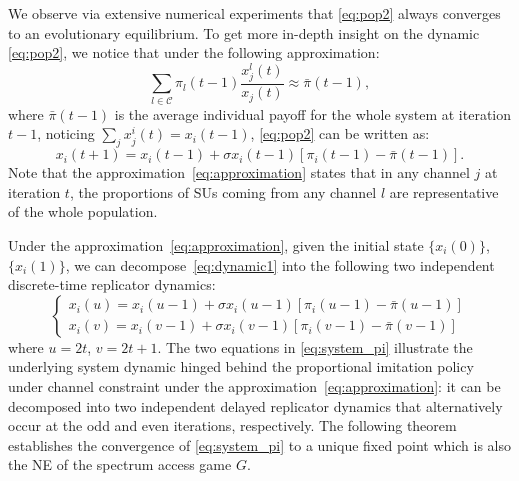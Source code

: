 \documentclass[12pt, onecolumn]{IEEEtran}
\theoremstyle{plain}
\theoremstyle{definition}
\begin{document}
\begin{comment}

\begin{figure*}
\begin{minipage}[r]{0.49\linewidth}
\texttt{[image: approximation.eps]}
\caption{System dynamic and its approximation by double replicator dynamic.}
\label{fig:approximation}
\end{minipage} \hfill
\begin{minipage}[c]{0.49\linewidth}
\texttt{[image: oursVSreplicators.eps]}
\caption{System dynamic with channel constraint and replicator dynamic without channel constraint}
\label{fig:oursVSreplicators}
\end{minipage}\hfill
\vspace{0.5cm}
\end{figure*}

\end{comment}


We observe via extensive numerical experiments that \eqref{eq:pop2} always converges to an evolutionary equilibrium. To get more in-depth insight on the dynamic \eqref{eq:pop2}, we notice that under the following approximation:
\begin{equation}
\sum_{l \in \mathcal{C}} \pi_l(t-1)\frac{x_j^l(t)}{x_j(t)} \approx \bar{\pi}(t-1),
\label{eq:approximation}
\end{equation}
where $\bar{\pi}(t-1)$ is the average individual payoff for the whole system at iteration $t-1$, noticing $\sum_j x_j^i(t)=x_i(t-1)$, \eqref{eq:pop2} can be written as:
\begin{equation}
x_i(t+1)=x_i(t-1)+\sigma x_i(t-1)[\pi_i(t-1)-\bar{\pi}(t-1)].
\label{eq:dynamic1}
\end{equation}
Note that the approximation~\eqref{eq:approximation} states that in any channel $j$ at iteration $t$, the proportions of SUs coming from any channel $l$ are representative of the whole population.

Under the approximation~\eqref{eq:approximation}, given the initial state $\{x_i(0)\}$, $\{x_i(1)\}$, we can decompose~\eqref{eq:dynamic1} into the following two independent discrete-time replicator dynamics:
\begin{equation}
\begin{cases}
x_i(u)=x_i(u-1)+\sigma x_i(u-1)[\pi_i(u-1)-\bar{\pi}(u-1)] \\
x_i(v)=x_i(v-1)+\sigma x_i(v-1)[\pi_i(v-1)-\bar{\pi}(v-1)]
\end{cases}
\label{eq:system_pi}
\end{equation}
where $u=2t$, $v=2t+1$. The two equations in \eqref{eq:system_pi} illustrate the underlying system dynamic hinged behind the proportional imitation policy under channel constraint under the approximation~\eqref{eq:approximation}: it can be decomposed into two independent delayed replicator dynamics that alternatively occur at the odd and even iterations, respectively. The following theorem establishes the convergence of \eqref{eq:system_pi} to a unique fixed point which is also the NE of the spectrum access game $G$.
\end{document}

